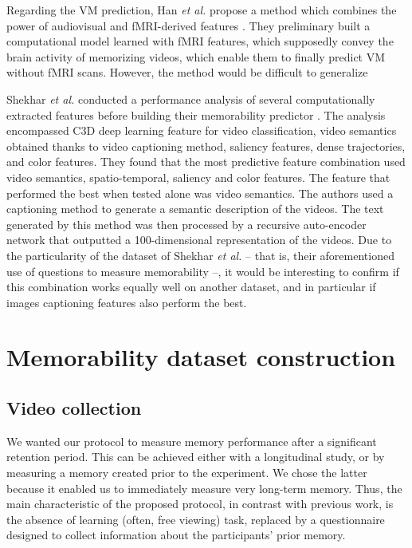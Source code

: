 \documentclass[sigconf]{acmart}
\begin{document}
Regarding the VM prediction, Han \textit{et al.} propose a method which combines the power of audiovisual and fMRI-derived features \cite{shekhar_2017_show}.
They preliminary built a computational model learned with fMRI features, which supposedly convey the brain activity of memorizing videos, which enable them to finally predict VM without fMRI scans.
However, the method would be difficult to generalize 

Shekhar \textit{et al.} conducted a performance analysis of several computationally extracted features before building their memorability predictor \cite{shekhar_2017_show}.
The analysis encompassed C3D deep learning feature for video classification, video semantics obtained thanks to video captioning method, saliency features, dense trajectories, and color features.
They found that the most predictive feature combination used video semantics, spatio-temporal, saliency and color features.
The feature that performed the best when tested alone was video semantics.
The authors used a captioning method to generate a semantic description of the videos.
The text generated by this method was then processed by a recursive auto-encoder network that outputted a 100-dimensional representation of the videos.
Due to the particularity of the dataset of Shekhar \textit{et al.} -- that is, their aforementioned use of questions to measure memorability --, it would be interesting to confirm if this combination works equally well on another dataset, and in particular if images captioning features also perform the best.

\section{Memorability dataset construction}
\subsection{Video collection}
We wanted our protocol to measure memory performance after a significant retention period.
This can be achieved either with a longitudinal study, or by measuring a memory created prior to the experiment.
We chose the latter because it enabled us to immediately measure very long-term memory.
Thus, the main characteristic of the proposed protocol, in contrast with previous work, is the absence of learning (often, free viewing) task, replaced by a questionnaire designed to collect information about the participants' prior memory.
\end{document}
